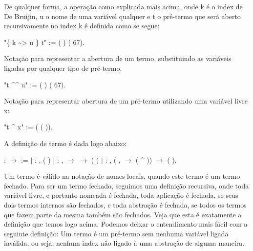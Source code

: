  De qualquer forma, a operação como explicada mais acima, onde k é o index de De Bruijin,
u o nome de uma variável qualquer e t o pré-termo que será aberto recursivamente no index k é 
definida como se segue:\begin{coqdoccode}
\coqdocemptyline
\coqdocnoindent
{} "\{ k \~{}> u \} t" := (   ) (  67).\coqdoceol
\coqdocemptyline
\coqdocemptyline
\end{coqdoccode}
Notação para representar a abertura de um termo, substituindo as variáveis ligadas
por qualquer tipo de pré-termo.\begin{coqdoccode}
\coqdocnoindent
{} "t \^{}\^{} u" := (  ) (  67).\coqdoceol
\coqdocemptyline
\end{coqdoccode}
Notação para representar abertura de um pré-termo utilizando uma variável livre
x:\begin{coqdoccode}
\coqdocnoindent
{} "t \^{} x" := (  ( )).\coqdoceol
\coqdocemptyline
\coqdocemptyline
\end{coqdoccode}
A definição de termo é dada logo abaixo:\begin{coqdoccode}
\coqdocemptyline
\coqdocnoindent
{}  :  \ensuremath{\rightarrow}  :=\coqdoceol
\coqdocindent{1.00em}
\ensuremath{|}  : \coqdockw{\ensuremath{\forall}} ,\coqdoceol
\coqdocindent{3.00em}
 ( )\coqdoceol
\coqdocindent{1.00em}
\ensuremath{|}  : \coqdockw{\ensuremath{\forall}}  ,\coqdoceol
\coqdocindent{3.00em}
  \ensuremath{\rightarrow} \coqdoceol
\coqdocindent{3.00em}
  \ensuremath{\rightarrow} \coqdoceol
\coqdocindent{3.00em}
 (  )\coqdoceol
\coqdocindent{1.00em}
\ensuremath{|}  : \coqdockw{\ensuremath{\forall}}  ,\coqdoceol
\coqdocindent{3.00em}
(\coqdockw{\ensuremath{\forall}} ,    \ensuremath{\rightarrow}  ( \^{} )) \ensuremath{\rightarrow}\coqdoceol
\coqdocindent{3.00em}
 ( ).\coqdoceol
\coqdocemptyline
\end{coqdoccode}
Um termo é válido na notação de nomes locais, quando este termo é um termo fechado. 
Para ser um termo fechado, seguimos uma definição recursiva, onde toda variável livre, e portanto
nomeada é fechada, toda aplicação é fechada, se seus dois termos internos são fechados, e toda
abstração é fechada, se todos os termos que fazem parte da mesma também são fechados. Veja que esta é
exatamente a definição que temos logo acima. Podemos deixar o entendimento mais fácil com a seguinte
definição: Um termo é um pré-termo sem nenhuma variável ligada inválida, ou seja, nenhum index não ligado
à uma abstração de alguma maneira.

